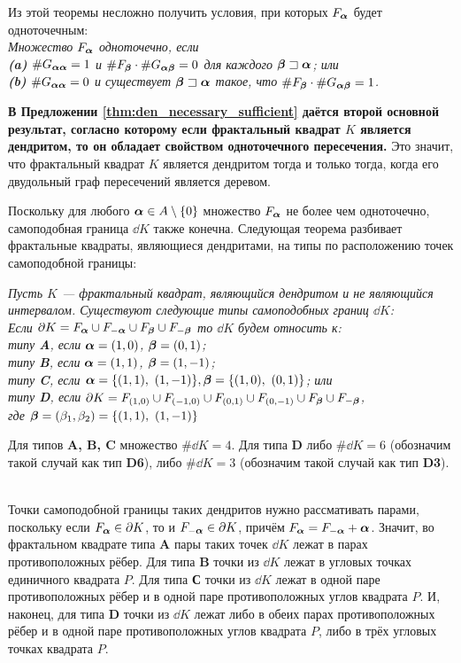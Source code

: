 Из этой теоремы несложно получить условия, при которых $F_{\bm{\alpha}}$ будет одноточечным:\\

{\em Множество $F_{\bm{\alpha}}$ одноточечно, если \\
\textbf{(a)} $\#G_{{\bm{\alpha}}{\bm{\alpha}}}=1$ и $\#F_{\bm{\beta}}\cdot\#G_{{\bm{\alpha}}{\bm{\beta}}}=0$ для каждого ${\bm{\beta}}\sqsupset{\bm{\alpha}}$; или\\
\textbf{(b)} $\#G_{{\bm{\alpha}}{\bm{\alpha}}}=0$ и существует ${\bm{\beta}}\sqsupset{\bm{\alpha}}$ такое, что $\#F_{\bm{\beta}}\cdot\#G_{{\bm{\alpha}}{\bm{\beta}}}=1$.}

{\bf В Предложении \ref{thm:den_necessary_sufficient} даётся второй основной результат, согласно которому если фрактальный квадрат $K$ является дендритом, то он обладает свойством одноточечного пересечения.}
Это значит, что фрактальный квадрат $K$ является дендритом тогда и только тогда, когда его двудольный граф пересечений является деревом.

Поскольку для любого ${\bm{\alpha}}\in A\setminus\{0\}$ множество $F_{\bm{\alpha}}$ не более чем одноточечно,   самоподобная граница $\dd K$ также конечна.
Следующая теорема разбивает фрактальные квадраты, являющиеся дендритами, на типы по расположению точек самоподобной границы:\\

{\em Пусть $K$ --- фрактальный квадрат, являющийся дендритом и не являющийся интервалом. 
Существуют следующие типы самоподобных границ $\dd K$:\\
Если $\partial K=F_{\bm{\alpha}}\cup F_{-{\bm{\alpha}}}\cup F_{\bm{\beta}}\cup F_{-{\bm{\beta}}}$ то $\dd K$ будем относить к:\\
типу {\bf A}, если ${\bm{\alpha}}=(1,0)$, $ {\bm{\beta}}=(0,1)$;\\ 
типу {\bf B}, если ${\bm{\alpha}}=(1,1)$, $ {\bm{\beta}}=(1,-1)$; \\
типу {\bf C}, если $\bma=\{(1,1),\ (1,-1)\},\bmb=\{(1,0),\ (0,1)\}$; или\\
типу {\bf D}, если $\partial K=F_{(1,0)}\cup F_{(-1,0)}\cup F_{(0,1)}\cup F_{(0,-1)}\cup F_{\bm{\beta}}\cup F_{-{\bm{\beta}}}$,\\ 
где $\bmb=(\be_1,\be_2)=\{(1,1),\ (1,-1)\}$
 
Для типов {\bf A, B, C} множество $\#\dd K=4$. 
Для типа {\bf D} либо $\#\dd K=6$ (обозначим такой случай как тип {\bf D6}), либо $\#\dd K=3$ (обозначим такой случай как тип {\bf D3}).}\\

Точки самоподобной границы таких дендритов нужно рассмативать парами, поскольку если $F_{\bm{\alpha}}\in \partial K$, то и $F_{-{\bm{\alpha}}}\in \partial K$,  причём $F_{{\bm{\alpha}}}=F_{-{\bm{\alpha}}}+{\bm{\alpha}}$.
Значит, во фрактальном квадрате типа {\bf A} пары таких точек $\dd K$ лежат в парах противоположных рёбер.
Для типа {\bf B} точки из $\dd K$ лежат в угловых точках единичного квадрата $P$.
Для типа {\bf С} точки из $\dd K$ лежат в одной паре противоположных рёбер и в одной паре противоположных углов квадрата $P$.
И, наконец, для типа {\bf D} точки из $\dd K$ лежат либо в обеих парах противоположных рёбер и в одной паре противоположных углов квадрата $P$, либо в трёх угловых точках квадрата $P$.

